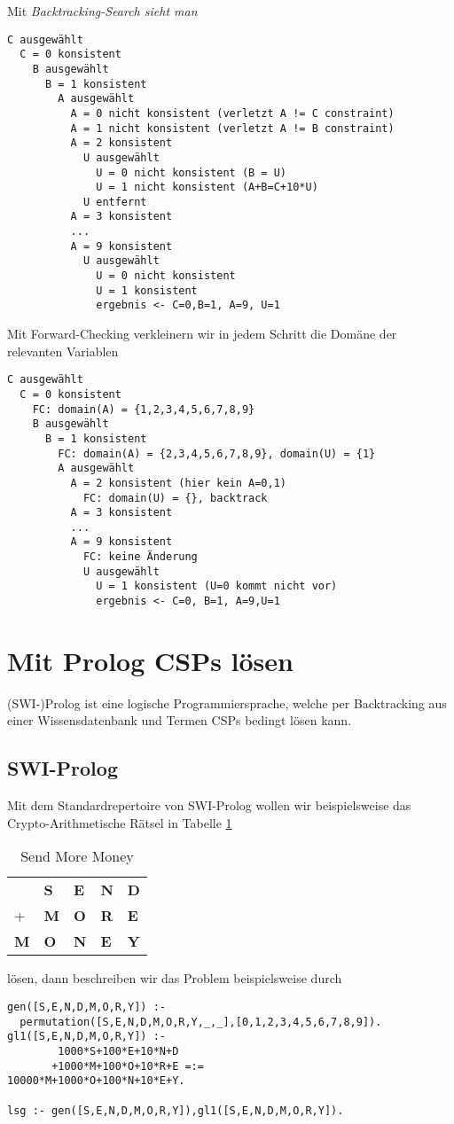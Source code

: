 \begin{beispiel}
	Mit \em Backtracking-Search \em sieht man
	\begin{verbatim}
C ausgewählt
  C = 0 konsistent
    B ausgewählt
      B = 1 konsistent
        A ausgewählt
          A = 0 nicht konsistent (verletzt A != C constraint)
          A = 1 nicht konsistent (verletzt A != B constraint)
          A = 2 konsistent
            U ausgewählt
              U = 0 nicht konsistent (B = U)
              U = 1 nicht konsistent (A+B=C+10*U)
            U entfernt
          A = 3 konsistent
          ...
          A = 9 konsistent
            U ausgewählt
              U = 0 nicht konsistent
              U = 1 konsistent
              ergebnis <- C=0,B=1, A=9, U=1
\end{verbatim}
	Mit Forward-Checking verkleinern wir in jedem Schritt die Domäne der relevanten Variablen

\begin{verbatim}
C ausgewählt
  C = 0 konsistent
    FC: domain(A) = {1,2,3,4,5,6,7,8,9}
    B ausgewählt
      B = 1 konsistent
        FC: domain(A) = {2,3,4,5,6,7,8,9}, domain(U) = {1}
        A ausgewählt
          A = 2 konsistent (hier kein A=0,1)
            FC: domain(U) = {}, backtrack
          A = 3 konsistent
          ...
          A = 9 konsistent
            FC: keine Änderung
            U ausgewählt
              U = 1 konsistent (U=0 kommt nicht vor)
              ergebnis <- C=0, B=1, A=9,U=1
\end{verbatim}

\end{beispiel}

\section{Mit Prolog CSPs lösen}
(SWI-)Prolog ist eine logische Programmiersprache, welche per Backtracking aus einer Wissensdatenbank und Termen CSPs bedingt lösen kann.
\subsection{SWI-Prolog}
Mit dem Standardrepertoire von SWI-Prolog wollen wir beispielsweise das Crypto-Arithmetische Rätsel in Tabelle \ref{SENDMORY}
\begin{table}[!h]
\centering
\caption{Send More Money}
\label{SENDMORY}
\begin{tabular}{lllll}
\textbf{}  & \textbf{S} & \textbf{E} & \textbf{N} & \textbf{D} \\
+ & \textbf{M} & \textbf{O} & \textbf{R} & \textbf{E} \\\hline
\textbf{M} & \textbf{O} & \textbf{N} & \textbf{E} & \textbf{Y}
\end{tabular}
\end{table}
lösen, dann beschreiben wir das Problem beispielsweise durch
\begin{verbatim}
gen([S,E,N,D,M,O,R,Y]) :-
  permutation([S,E,N,D,M,O,R,Y,_,_],[0,1,2,3,4,5,6,7,8,9]).
gl1([S,E,N,D,M,O,R,Y]) :-
        1000*S+100*E+10*N+D
       +1000*M+100*O+10*R+E =:=
10000*M+1000*O+100*N+10*E+Y.

lsg :- gen([S,E,N,D,M,O,R,Y]),gl1([S,E,N,D,M,O,R,Y]).
\end{verbatim}

